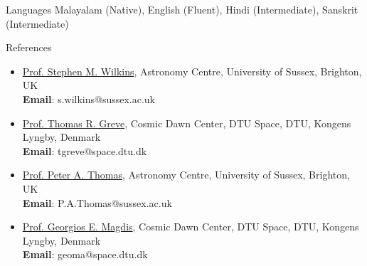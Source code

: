 \documentclass[a4paper,10pt]{resume} %
\begin{document}

%

\begin{rSection}{Languages}
Malayalam (Native), English (Fluent), Hindi (Intermediate), Sanskrit (Intermediate)
\end{rSection}

\begin{rSection}{References}
\begin{itemize}
   \item \href{http://stephenwilkins.co.uk/}{Prof. Stephen M. Wilkins}, Astronomy Centre, University of Sussex, Brighton, UK\\
   \textbf{Email}: s.wilkins@sussex.ac.uk
   \item \href{https://cosmicdawn.dk/staff/thomas/}{Prof. Thomas R. Greve}, Cosmic Dawn Center, DTU Space, DTU, Kongens Lyngby, Denmark\\
   \textbf{Email}: tgreve@space.dtu.dk
   \item \href{https://profiles.sussex.ac.uk/p2672-peter-thomas/about}{Prof. Peter A. Thomas}, Astronomy Centre, University of Sussex, Brighton, UK\\
   \textbf{Email}: P.A.Thomas@sussex.ac.uk
   \item \href{https://cosmicdawn.dk/staff/georgios-magdis/}{Prof. Georgios E. Magdis}, Cosmic Dawn Center, DTU Space, DTU, Kongens Lyngby, Denmark\\
   \textbf{Email}: geoma@space.dtu.dk
\end{itemize}
\end{rSection}
\end{document}
